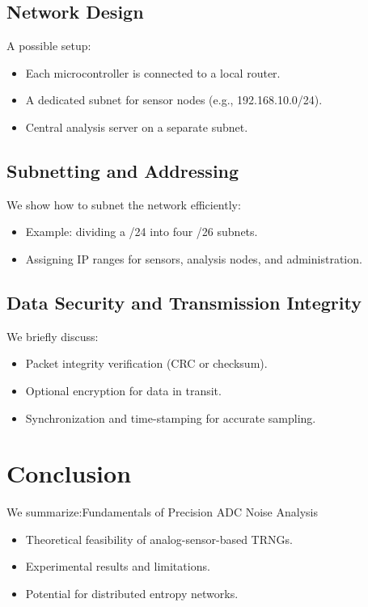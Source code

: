\subsection{Network Design}
A possible setup:
\begin{itemize}
    \item Each microcontroller is connected to a local router.
    \item A dedicated subnet for sensor nodes (e.g., 192.168.10.0/24).
    \item Central analysis server on a separate subnet.
\end{itemize}

\subsection{Subnetting and Addressing}
We show how to subnet the network efficiently:
\begin{itemize}
    \item Example: dividing a /24 into four /26 subnets.
    \item Assigning IP ranges for sensors, analysis nodes, and administration.
\end{itemize}

\subsection{Data Security and Transmission Integrity}
We briefly discuss:
\begin{itemize}
    \item Packet integrity verification (CRC or checksum).
    \item Optional encryption for data in transit.
    \item Synchronization and time-stamping for accurate sampling.
\end{itemize}

\newpage
\section{Conclusion}
We summarize:Fundamentals of Precision ADC
Noise Analysis
\begin{itemize}
    \item Theoretical feasibility of analog-sensor-based TRNGs.
    \item Experimental results and limitations.
    \item Potential for distributed entropy networks.
\end{itemize}

